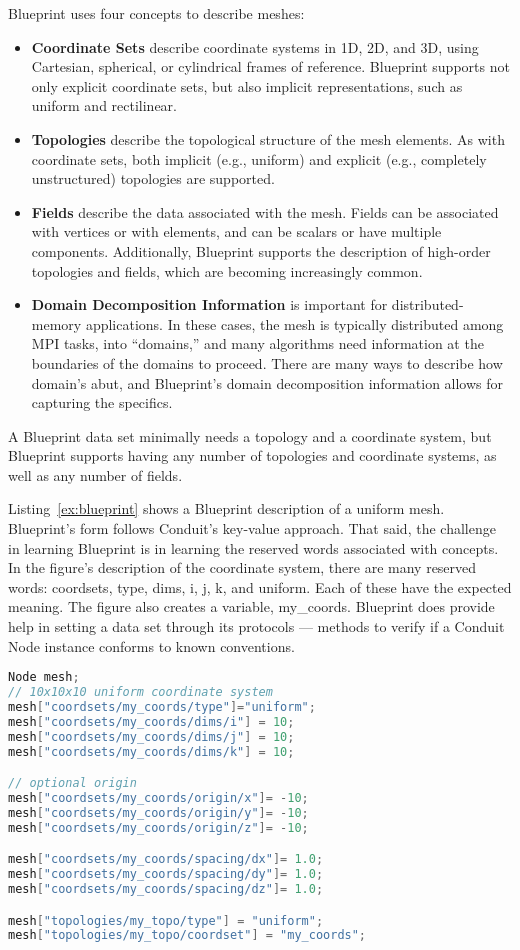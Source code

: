 Blueprint uses four concepts to describe meshes:
\begin{itemize}
  \item \textbf{Coordinate Sets} describe coordinate systems in 1D, 2D, and 3D,
using Cartesian, spherical, or cylindrical frames of reference.
%
Blueprint supports not only explicit coordinate sets, but also implicit representations,
such as uniform and rectilinear.
  \item \textbf{Topologies} describe the topological structure of the mesh elements.
%
As with coordinate sets, both implicit (e.g., uniform) and explicit
(e.g., completely unstructured) topologies are supported.
  \item \textbf{Fields} describe the data associated with the mesh.
Fields can be associated with vertices or with elements, and
can be scalars or have multiple components.
%
Additionally, Blueprint supports the description of high-order
topologies and fields, which are becoming increasingly common.
  \item \textbf{Domain Decomposition Information} is important for distributed-memory applications.
%
In these cases, the mesh is typically distributed among MPI tasks, into ``domains,'' and
many algorithms need information at the boundaries of the domains to proceed.
%
There are many ways to describe how domain's abut, and Blueprint's domain decomposition information
allows for capturing the specifics.
\end{itemize}
A Blueprint data set minimally needs a topology and a coordinate system,
but Blueprint supports having any number of topologies and coordinate
systems, as well as any number of fields.
%


Listing~\ref{ex:blueprint} shows a Blueprint description of a uniform mesh.
%
Blueprint's form follows Conduit's key-value approach.
%
That said, the challenge in learning Blueprint is in learning the reserved words associated
with concepts.
%
In the figure's description of the coordinate system, there are many reserved words:
coordsets, type, dims,  i, j, k, and uniform.
%
Each of these have the expected meaning.
%
The figure also creates a variable, my\_coords.
%
Blueprint does provide help in setting a data set through its protocols ---
methods to verify if a Conduit Node instance conforms to known conventions.


\begin{lstlisting}[language=C++,caption={\label{ex:blueprint}An example of a specifying a $10^3$ uniform grid in Blueprint.}]
Node mesh;
// 10x10x10 uniform coordinate system
mesh["coordsets/my_coords/type"]="uniform";
mesh["coordsets/my_coords/dims/i"] = 10;
mesh["coordsets/my_coords/dims/j"] = 10;
mesh["coordsets/my_coords/dims/k"] = 10;

// optional origin
mesh["coordsets/my_coords/origin/x"]= -10;
mesh["coordsets/my_coords/origin/y"]= -10;
mesh["coordsets/my_coords/origin/z"]= -10;

mesh["coordsets/my_coords/spacing/dx"]= 1.0;
mesh["coordsets/my_coords/spacing/dy"]= 1.0;
mesh["coordsets/my_coords/spacing/dz"]= 1.0;

mesh["topologies/my_topo/type"] = "uniform";
mesh["topologies/my_topo/coordset"] = "my_coords";
\end{lstlisting}

